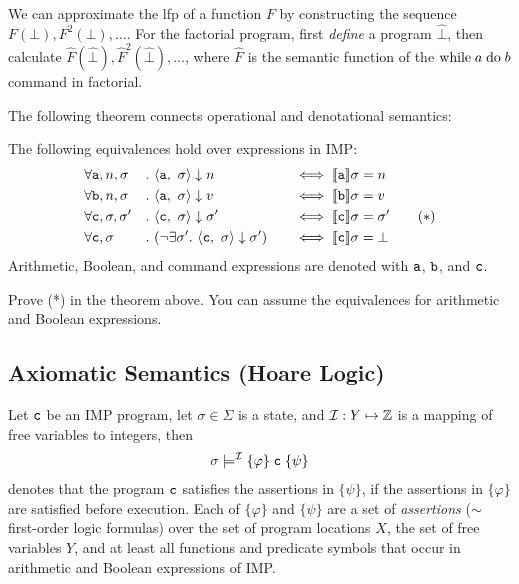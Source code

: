 \begin{exercise}
    We can approximate the lfp of a function $F$ 
    by constructing the sequence 
    $F(\bot), F^2(\bot), \dots$.
    For the factorial program,
    first \emph{define} a program $\hat{\bot}$,
    then calculate 
    $\hat{F}(\hat{\bot}), \hat{F}^2(\hat{\bot}), \dots$,
    where $\hat{F}$ is 
    the semantic function of the $\mathrm{while}\;a\;\mathrm{do}\;b$ command in factorial.
\end{exercise}

The following theorem connects 
operational and denotational semantics:

\begin{theorem}
  The following equivalences hold
  over expressions in IMP:
  \begin{alignat*}{5}
    & \forall \mathtt{a}, n, \sigma && .~ 
      \langle \mathtt{a},~\sigma \rangle \downarrow n 
      &&& \iff \llbracket \mathtt{a} \rrbracket \sigma & = n \\
    & \forall \mathtt{b}, n, \sigma && .~
      \langle \mathtt{a},~\sigma \rangle \downarrow v
      &&& \iff \llbracket \mathtt{b} \rrbracket \sigma & = v \\
    & \forall \mathtt{c}, \sigma, \sigma' && .~
      \langle \mathtt{c},~\sigma \rangle \downarrow \sigma'
      &&& \iff \llbracket \mathtt{c} \rrbracket \sigma & = \sigma' \qquad (*) \\
    & \forall \mathtt{c}, \sigma && .~
      (\neg \exists \sigma'.~ \langle \mathtt{c},~\sigma \rangle \downarrow \sigma')
      &&& \iff \llbracket \mathtt{c} \rrbracket \sigma & = \bot
  \end{alignat*}
  Arithmetic, Boolean, and command expressions
  are denoted with $\mathtt{a}$, $\mathtt{b}$, and $\mathtt{c}$.
\end{theorem}

\begin{exercise}[Optional]
    Prove (*) in the theorem above.
    You can assume the equivalences for 
    arithmetic and Boolean expressions.
\end{exercise}


\subsection{Axiomatic Semantics (Hoare Logic)}


\begin{definition}[Notation]
Let $\mathtt{c}$ be an IMP program, let $\sigma \in \Sigma$ is a state,
and $\mathcal{I}: Y \mapsto \mathbb{Z}$ is a mapping of free variables to integers,
then
\begin{align*}
    \sigma \models^{\mathcal{I}}  \{ \varphi \} \;\mathtt{c}\;  \{ \psi \} 
\end{align*}
denotes that the program $\mathtt{c}$ satisfies the assertions in $\{ \psi \}$, if the assertions in $\{ \varphi \}$ are satisfied before execution.
Each of $\{ \varphi \}$ and $\{ \psi \}$
are a set of \emph{assertions} 
($\sim$ first-order logic formulas)
over the set of program locations $X$,
the set of free variables $Y$,
and at least all functions and predicate symbols
that occur in arithmetic and Boolean expressions of IMP.
\end{definition}

